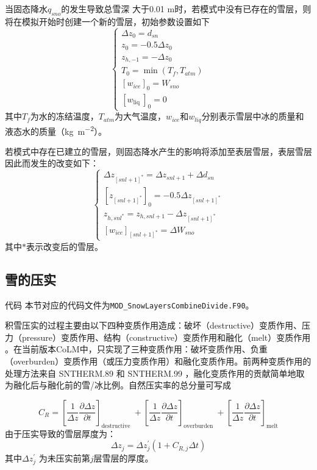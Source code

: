 当固态降水$q_{sno}$的发生导致总雪深 大于0.01 m时，若模式中没有已存在的雪层，则将在模拟开始时创建一个新的雪层，初始参数设置如下
\begin{equation}
\left\{\begin{array}{c}\Delta z_{0}={d}_{{sn}} \\ z_{0}=-0.5 \Delta z_{0} \\ z_{{h},-1}=-\Delta z_{0} \\ T_{0}=\min \left(T_{{f}}, T_{{atm}}\right) \\ {\left[{w}_{{ice}}\right]_{0}={W}_{{sno}}} \\ {\left[{w}_{\text {liq }}\right]_{0}=0}\end{array}\right.
\end{equation}
其中$T_f$为水的冻结温度，$T_{atm}$为大气温度，$w_{ice}$和$w_{liq}$分别表示雪层中冰的质量和液态水的质量（\unit{kg.m^{-2}}）。


若模式中存在已建立的雪层，则固态降水产生的影响将添加至表层雪层，表层雪层因此而发生的改变如下：
\begin{equation}
\left\{\begin{array}{c}\Delta z_{[{snl}+1]^{*}}=\Delta z_{{snl}+1}+\Delta {d}_{{sn}} \\ {\left[z_{[{snl}+1]^{*}}\right]_{0}=-0.5 \Delta z_{[{snl}+1]^{*}}} \\ z_{{h}, {snl}^{*}}=z_{{h}, {snl}+1}-\Delta z_{[{snl}+1]^{*}} \\ {\left[{w}_{{ice}}\right]_{[{snl}+1]^{*}}=\Delta {W}_{{sno}}}\end{array}\right.
\end{equation}
其中$\ast$表示改变后的雪层。


\subsection{雪的压实}
\begin{mymdframed}{代码}
本节对应的代码文件为\texttt{MOD\_SnowLayersCombineDivide.F90}。
\end{mymdframed}
积雪压实的过程主要由以下四种变质作用造成：破坏（destructive）变质作用、压力（pressure）变质作用、结构（constructive）变质作用和融化（melt）变质作用 \citep{yen1981review}。在当前版本CoLM中，只实现了三种变质作用：破坏变质作用、负重（overburden）变质作用（或压力变质作用）和融化变质作用。前两种变质作用的处理方法来自 SNTHERM.89 \citep{jordan1991one}和 SNTHERM.99 \citep{jordan1999heat}，融化变质作用的贡献简单地取为融化后与融化前的雪/冰比例。自然压实率的总分量可写成

\begin{equation}
{C}_{{R}}=\left[\frac{1}{\Delta {z}} \frac{\partial \Delta {z}}{\partial {t}}\right]_{\text {destructive }}+\left[\frac{1}{\Delta {z}} \frac{\partial \Delta {z}}{\partial {t}}\right]_{\text {overburden }}+\left[\frac{1}{\Delta {z}} \frac{\partial \Delta {z}}{\partial {t}}\right]_{\text{melt}}
\end{equation}
由于压实导致的雪层厚度为：
\begin{equation}
\Delta z_{j}=\Delta z_{j}^{\prime}\left(1+C_{R, j} \Delta t\right)
\end{equation}
其中$\Delta {z}_{{j}}^{\prime}$ 为未压实前第$j$层雪层的厚度。


